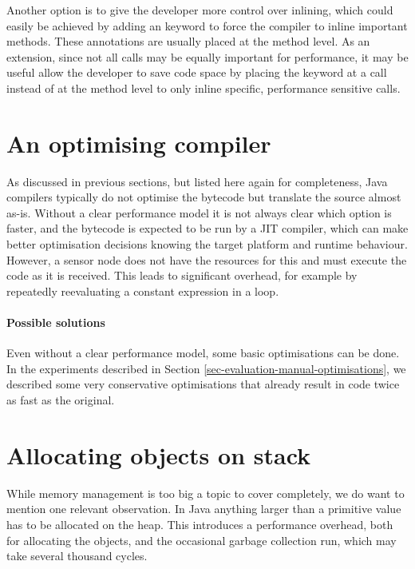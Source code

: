 Another option is to give the developer more control over inlining, which could easily be achieved by adding an  keyword to force the compiler to inline important methods. These annotations are usually placed at the method level. As an extension, since not all calls may be equally important for performance, it may be useful allow the developer to save code space by placing the  keyword at a call instead of at the method level to only inline specific, performance sensitive calls.




\section{An optimising compiler}
\label{sec-optimising-javac}
As discussed in previous sections, but listed here again for completeness, Java compilers typically do not optimise the bytecode but translate the source almost as-is. Without a clear performance model it is not always clear which option is faster, and the bytecode is expected to be run by a JIT compiler, which can make better optimisation decisions knowing the target platform and runtime behaviour. However, a sensor node does not have the resources for this and must execute the code as it is received. This leads to significant overhead, for example by repeatedly reevaluating a constant expression in a loop.

\paragraph{Possible solutions}
Even without a clear performance model, some basic optimisations can be done. In the experiments described in Section \ref{sec-evaluation-manual-optimisations}, we described some very conservative optimisations that already result in code twice as fast as the original.




\section{Allocating objects on stack}
\label{sec-no-gc}
While memory management is too big a topic to cover completely, we do want to mention one relevant observation. In Java anything larger than a primitive value has to be allocated on the heap. This introduces a performance overhead, both for allocating the objects, and the occasional garbage collection run, which may take several thousand cycles.

